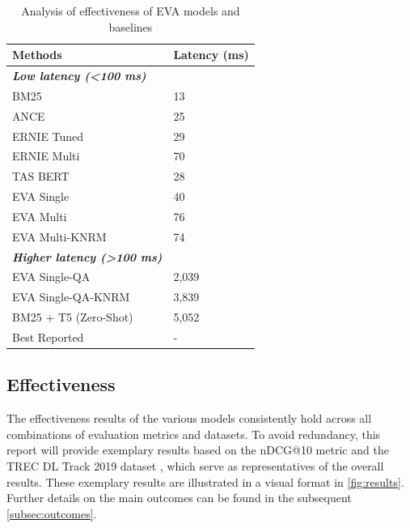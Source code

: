 \def\arraystretch{1.2}
\begin{table}[!htb]
    \small
    \centering
    \begin{tabular}{l|l}
    \textbf{Methods}                                        & \textbf{Latency (ms)} \\ \hline
    \textit{\textbf{Low latency (\textless{}100 ms)}}       & \textit{\textbf{}}    \\ \hline
    BM25                                                    & 13                    \\
    ANCE                                                    & 25                    \\
    ERNIE Tuned                                             & 29                    \\
    ERNIE Multi                                             & 70                    \\
    TAS BERT                                                & 28                    \\
    EVA Single                                              & 40                    \\
    EVA Multi                                               & 76                    \\
    EVA Multi-KNRM                                          & 74                    \\ \hline
    \textit{\textbf{Higher latency (\textgreater{}100 ms)}} & \textit{\textbf{}}    \\ \hline
    EVA Single-QA                                           & 2,039                  \\
    EVA Single-QA-KNRM                                      & 3,839                  \\
    BM25 + T5 (Zero-Shot)                                   & 5,052                  \\ \hline
    Best Reported                                           & -                    
    \end{tabular}
    \caption{Analysis of effectiveness of EVA models and baselines}
    \label{tab:results_effectiveness}
\end{table}

\subsection{Effectiveness}\label{sec:effectiveness}

The effectiveness results of the various models consistently hold across all combinations of evaluation metrics and datasets. To avoid redundancy, this report will provide exemplary results based on the nDCG@10 metric and the TREC DL Track 2019 dataset \cite{trec_dl_2019}, which serve as representatives of the overall results. These exemplary results are illustrated in a visual format in \autoref{fig:results}. Further details on the main outcomes can be found in the subsequent \autoref{subsec:outcomes}.

